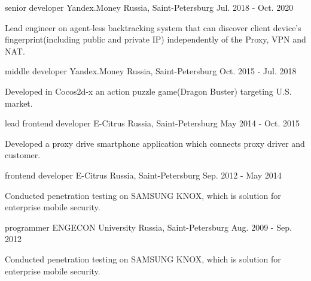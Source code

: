 \begin{cventries}
  \cventry
    {senior developer} %
    {Yandex.Money} %
    {Russia, Saint-Petersburg} %
    {Jul. 2018 - Oct. 2020} %
    {
      \begin{cvitems} %
        \item {Lead engineer on agent-less backtracking system that can discover client device's fingerprint(including public and private IP) independently of the Proxy, VPN and NAT.}
      \end{cvitems}
    }

  \cventry
    {middle developer} %
    {Yandex.Money} %
    {Russia, Saint-Petersburg} %
    {Oct. 2015 - Jul. 2018} %
    {
      \begin{cvitems} %
        \item {Developed in Cocos2d-x an action puzzle game(Dragon Buster) targeting U.S. market.}
      \end{cvitems}
    }

  \cventry
    {lead frontend developer} %
    {E-Citrus} %
    {Russia, Saint-Petersburg} %
    {May 2014 - Oct. 2015} %
    {
      \begin{cvitems} %
        \item {Developed a proxy drive smartphone application which connects proxy driver and customer.}
      \end{cvitems}
    }

  \cventry
    {frontend developer} %
    {E-Citrus} %
    {Russia, Saint-Petersburg} %
    {Sep. 2012 - May 2014} %
    {
      \begin{cvitems} %
        \item {Conducted penetration testing on SAMSUNG KNOX, which is solution for enterprise mobile security.}
      \end{cvitems}
    }

  \cventry
    {programmer} %
    {ENGECON University} %
    {Russia, Saint-Petersburg} %
    {Aug. 2009 - Sep. 2012} %
    {
      \begin{cvitems} %
        \item {Conducted penetration testing on SAMSUNG KNOX, which is solution for enterprise mobile security.}
      \end{cvitems}
    }

\end{cventries}
